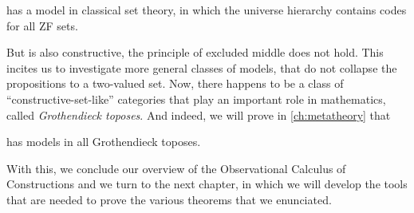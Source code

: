 \begin{theorem}
	\SetoidCC has a model in classical set theory, in which the universe
	hierarchy contains codes for all ZF sets.
\end{theorem}

But \SetoidCC is also constructive, \ie the principle of excluded middle
does not hold. 
% 
This incites us to investigate more general classes of models, that do not 
collapse the propositions to a two-valued set. Now, there happens to be a
class of ``constructive-set-like'' categories that play an important role
in mathematics, called \emph{Grothendieck toposes}. And indeed, we will
prove in \cref{ch:metatheory} that

\begin{theorem}
	\SetoidCC has models in all Grothendieck toposes.
\end{theorem}

With this, we conclude our overview of the Observational Calculus of 
Constructions and we turn to the next chapter, in which we will develop the
tools that are needed to prove the various theorems that we enunciated.



